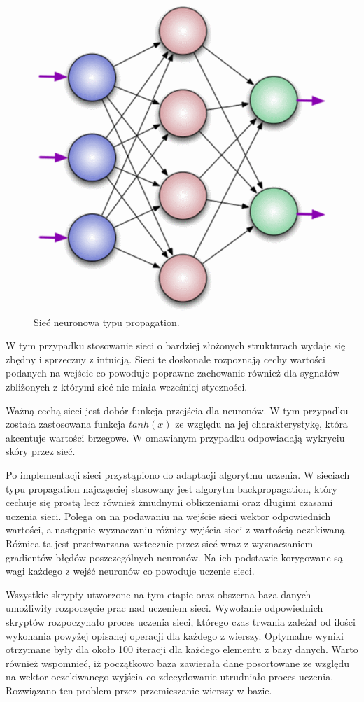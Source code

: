 \begin{figure}[tbph!]
	\centering
	\includegraphics[width=0.7\linewidth]{images/nn.png}
	\caption{Sieć neuronowa typu propagation.}
	\label{fig:nn}
\end{figure} 

W tym przypadku stosowanie sieci o bardziej złożonych strukturach wydaje się zbędny i sprzeczny z intuicją. Sieci te doskonale rozpoznają cechy wartości podanych na wejście co powoduje poprawne zachowanie również dla sygnałów zbliżonych z którymi sieć nie miała wcześniej styczności. 

Ważną cechą sieci jest dobór funkcja przejścia dla neuronów. W tym przypadku została zastosowana funkcja $tanh(x)$ ze względu na jej charakterystykę, która akcentuje wartości brzegowe. W omawianym przypadku odpowiadają wykryciu skóry przez sieć. 

Po implementacji sieci przystąpiono do adaptacji algorytmu uczenia. W sieciach typu propagation najczęsciej stosowany jest algorytm backpropagation, który cechuje się prostą lecz również żmudnymi obliczeniami oraz długimi czasami uczenia sieci. Polega on na podawaniu na wejście sieci wektor odpowiednich wartości, a następnie wyznaczaniu różnicy wyjścia sieci z wartością oczekiwaną. Różnica ta jest przetwarzana wstecznie przez sieć wraz z wyznaczaniem gradientów błędów poszczególnych neuronów. Na ich podstawie korygowane są wagi każdego z wejść neuronów co powoduje uczenie sieci.

Wszystkie skrypty utworzone na tym etapie oraz obszerna baza danych umożliwiły rozpoczęcie prac nad uczeniem sieci. Wywołanie odpowiednich skryptów rozpoczynało proces uczenia sieci, którego czas trwania zależał od ilości wykonania powyżej opisanej operacji dla każdego z wierszy. Optymalne wyniki otrzymane były dla około 100 iteracji dla każdego elementu z bazy danych. Warto również wspomnieć, iż początkowo baza zawierała dane posortowane ze względu na wektor oczekiwanego wyjścia co zdecydowanie utrudniało proces uczenia. Rozwiązano ten problem przez przemieszanie wierszy w bazie.


